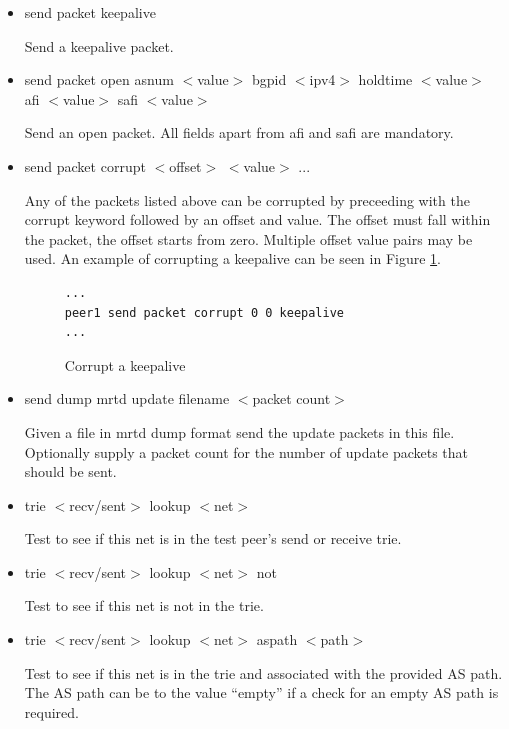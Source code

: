 \documentclass[11pt]{article}
\begin{document}
\begin{itemize}
  \item {\sf send packet keepalive}

  Send a keepalive packet.

  \item {\sf send packet open
                        asnum $<$value$>$ 
                        bgpid $<$ipv4$>$ 
                        holdtime $<$value$>$
			afi $<$value$>$
			safi $<$value$>$}

  Send an open packet.  All fields apart from afi and safi are mandatory.

  \item {\sf send packet corrupt $<$offset$>$ $<$value$>$ ... }

  Any of the packets listed above can be corrupted by preceeding with
  the corrupt keyword followed by an offset and value. The offset must
  fall within the packet, the offset starts from zero. Multiple offset
  value pairs may be used. An example of corrupting a keepalive can be
  seen in Figure \ref{prog:corrupt}.

\begin{figure}[htbp]
\small
\begin{verbatim}
...
peer1 send packet corrupt 0 0 keepalive
...
\end{verbatim}
\vspace{-0.1in}
\caption{\label{prog:corrupt}Corrupt a keepalive}
\end{figure}

  \item {\sf send dump mrtd update filename $<$packet count$>$}
  
  Given a file in mrtd dump format send the update packets in this
  file. Optionally supply a packet count for the number of update
  packets that should be sent.

  \item {\sf trie $<$recv/sent$>$ lookup $<$net$>$}

  Test to see if this net is in the test peer's send or receive trie.

  \item {\sf trie $<$recv/sent$>$ lookup $<$net$>$ not}

  Test to see if this net is not in the trie.

  \item {\sf trie $<$recv/sent$>$ lookup $<$net$>$ aspath $<$path$>$}

  Test to see if this net is in the trie and associated with the
  provided AS path. The AS path can be to the value ``empty'' if a
  check for an empty AS path is required.


\end{itemize}
\end{document}
